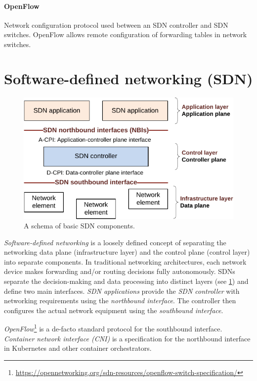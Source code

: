 \paragraph{OpenFlow} Network configuration protocol used between an SDN controller and SDN switches. OpenFlow allows remote configuration of forwarding tables in network switches.


\section{Software-defined networking (SDN)}

\begin{figure}
    \centering
    \includegraphics[width=.6\linewidth]{img/sdn_basic_schema.pdf}
    \caption{A schema of basic SDN components.}
    \label{fig:sdn-schema}
\end{figure}

\emph{Software-defined networking} is a loosely defined concept of separating the networking data plane (infrastructure layer) and the control plane (control layer) into separate components. In traditional networking architectures, each network device makes forwarding and/or routing decisions fully autonomously. SDNs separate the decision-making and data processing into distinct layers (see \cref{fig:sdn-schema}) and define two main interfaces. \emph{SDN applications} provide the \emph{SDN controller} with networking requirements using the \emph{northbound interface}. The controller then configures the actual network equipment using the \emph{southbound interface}.

\emph{OpenFlow}\footnote{\url{https://opennetworking.org/sdn-resources/openflow-switch-specification/}} is a de-facto standard protocol for the southbound interface. \emph{Container network interface (CNI)} is a specification for the northbound interface in Kubernetes and other container orchestrators.


